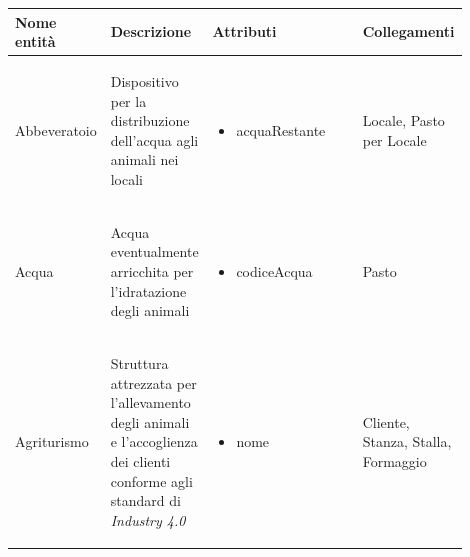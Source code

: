 \documentclass[12pt,a4paper]{article}
\begin{document}
\begin{center}

\setlength{\extrarowheight}{1.5pt}

\begin{longtable}{|p{0.14\linewidth}|p{0.20\linewidth}|p{0.36\linewidth}|p{0.20\linewidth}|}
\hline 
\textbf{Nome entità} 	& \textbf{Descrizione} & \textbf{Attributi} & \textbf{Collegamenti}\\ 

    
\hline
Abbevera\-toio 		& \begin{flushleft}\vspace{-15pt} Dispositivo per la distribuzione dell'acqua agli animali nei locali \end{flushleft}
					& \begin{itemize}
						\setlength{\itemindent}{-1em}
						\vspace{-25pt}
						\setlength\itemsep{-0.25em}
						\item acquaRestante
						
					\end{itemize}
					& \begin{flushleft}\vspace{-25pt} Locale, Pasto per Locale \end{flushleft}\\

\hline
Acqua 				& \begin{flushleft}\vspace{-25pt} Acqua eventualmente arricchita per l'idratazione degli animali \end{flushleft}
					& \begin{itemize}
						\setlength{\itemindent}{-1em}
						\vspace{-25pt}
						\setlength\itemsep{-0.25em}
						\item codiceAcqua
					\end{itemize}
					& \begin{flushleft}\vspace{-25pt} Pasto \end{flushleft}\\

\hline
Agrituri\-smo 			& \begin{flushleft}\vspace{-25pt} Struttura attrezzata per l'allevamento degli animali e l'accoglienza dei clienti conforme agli standard di \textit{Industry 4.0}  \end{flushleft}
					& \begin{itemize}
						\setlength{\itemindent}{-1em}
						\vspace{-25pt}
						\setlength\itemsep{-0.25em}
						\item nome
					\end{itemize}
					& \begin{flushleft}\vspace{-25pt} Cliente, Stanza, Stalla, Formaggio \end{flushleft} \\


\end{longtable}
\end{center}
\end{document}
